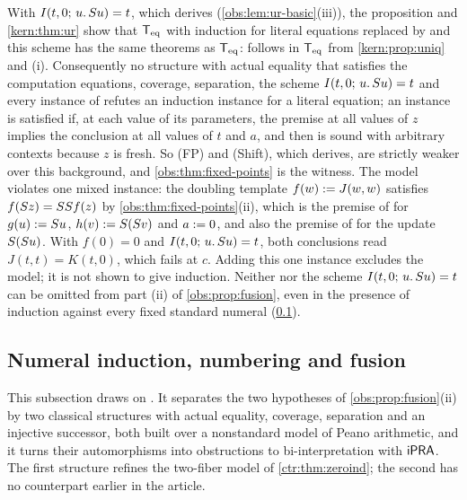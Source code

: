 With $I(t,0;\,u.\,S u)=t$, which  derives
(\cref{obs:lem:ur-basic}(iii)), the proposition and \cref{kern:thm:ur} show
that $\mathsf{T}_{\mathrm{eq}}$ with induction for literal equations replaced by 
and this scheme has the same theorems as $\mathsf{T}_{\mathrm{eq}}$:  follows in
$\mathsf{T}_{\mathrm{eq}}$ from \cref{kern:prop:uniq} and (i). Consequently no structure with actual
equality that satisfies the computation equations, coverage, separation, the
scheme $I(t,0;\,u.\,S u)=t$ and every instance of  refutes
an induction instance for a literal equation; an instance is satisfied if, at
each value of its parameters, the premise at all values of $z$ implies the
conclusion at all values of $t$ and $a$, and then  is sound with
arbitrary contexts because $z$ is fresh. So (FP) and (Shift), which
 derives, are strictly weaker over this background, and
\cref{obs:thm:fixed-points} is the witness. The model violates one mixed
instance: the doubling template $f(w)\mathrel{:=} J(w,w)$ satisfies
$f(S z)=SS f(z)$ by \cref{obs:thm:fixed-points}(ii), which is the
premise of  for $g(u)\mathrel{:=}S u$, $h(v)\mathrel{:=}S(S v)$
and $a\mathrel{:=} 0$, and also the premise of  for the update
$S(S u)$. With $f(0)=0$ and $I(t,0;\,u.\,S u)=t$, both conclusions
read $J(t,t)=K(t,0)$, which fails at $c$. Adding this one instance excludes
the model; it is not shown to give induction. Neither  nor the
scheme $I(t,0;\,u.\,S u)=t$ can be omitted from part (ii) of
\cref{obs:prop:fusion}, even in the presence of induction against every fixed
standard numeral (\cref{obs:sec:barriers}).

\subsection{Numeral induction, numbering and fusion}
\label{obs:sec:barriers}

This subsection draws on . It
separates the two hypotheses of \cref{obs:prop:fusion}(ii) by two classical
structures with actual equality, coverage, separation and an injective
successor, both built over a nonstandard model of Peano arithmetic, and it
turns their automorphisms into obstructions to bi-interpretation with
$\mathsf{iPRA}$. The first structure refines the two-fiber model of
\cref{ctr:thm:zeroind}; the second has no counterpart earlier in the article.

